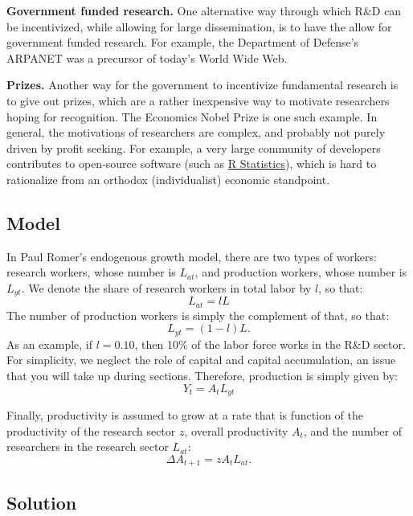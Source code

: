 \documentclass[]{book}
\theoremstyle{definition}
\theoremstyle{definition}
\theoremstyle{definition}
\theoremstyle{remark}
\begin{document}
\textbf{Government funded research.} One alternative way through which
R\&D can be incentivized, while allowing for large dissemination, is to
have the allow for government funded research. For example, the
Department of Defense's ARPANET was a precursor of today's World Wide
Web.

\textbf{Prizes.} Another way for the government to incentivize
fundamental research is to give out prizes, which are a rather
inexpensive way to motivate researchers hoping for recognition. The
Economics Nobel Prize is one such example. In general, the motivations
of researchers are complex, and probably not purely driven by profit
seeking. For example, a very large community of developers contributes
to open-source software (such as \href{R.intro/html}{R Statistics}),
which is hard to rationalize from an orthodox (individualist) economic
standpoint.

\subsection{Model}\label{model}

In Paul Romer's endogenous growth model, there are two types of workers:
research workers, whose number is \(L_{at}\), and production workers,
whose number is \(L_{yt}\). We denote the share of research workers in
total labor by \(l\), so that: \[L_{at} = l L\] The number of production
workers is simply the complement of that, so that: \[L_{yt} = (1-l)L.\]
As an example, if \(l=0.10\), then 10\% of the labor force works in the
R\&D sector. For simplicity, we neglect the role of capital and capital
accumulation, an issue that you will take up during sections. Therefore,
production is simply given by: \[Y_{t} =A_{t} L_{yt}\]

Finally, productivity is assumed to grow at a rate that is function of
the productivity of the research sector \(z\), overall productivity
\(A_t\), and the number of researchers in the research sector
\(L_{at}\): \[\Delta A_{t+1} =z A_{t} L_{at}.\]

\subsection{Solution}\label{solution-2}
\end{document}
